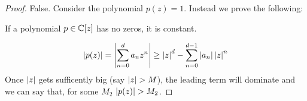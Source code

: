 \documentclass{homework}
\begin{document}
                                                                                                                                                                                                                                                            \begin{proof}
                                                                                                                                                                                                                                                            False. Consider the polynomial $p(z)=1$. Instead we prove the following:
                                                                                                                                                                                                                                                            \begin{theorem}
                                                                                                                                                                                                                                                            If a polynomial $p \in \mathbb{C}[z]$ has no zeros, it is constant.
                                                                                                                                                                                                                                                            \end{theorem}
                                                                                                                                                                                                                                                            \[
                                                                                                                                                                                                                                                            \left|p(z)\right| = \left|\sum_{n=0}^d a_nz^n\right| \geq \left|z\right|^d - \sum_{n=0}^{d-1} \left|a_n\right|\left|z\right|^n
                                                                                                                                                                                                                                                            \]
                                                                                                                                                                                                                                                            Once $\left|z\right|$ gets sufficently big (say $\abs{z}>M$), the leading term will dominate and we can say that, for some $M_2$ $\abs{p(z)}>M_2$.


\end{proof}
\end{document}
